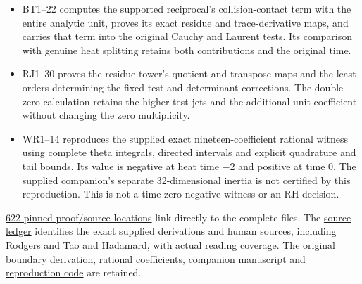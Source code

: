 \documentclass[
]{article}
\providecommand{\tightlist}{%
  \setlength{\itemsep}{0pt}\setlength{\parskip}{0pt}}
\begin{document}
\begin{itemize}
\tightlist
\item
  BT1--22 computes the supported reciprocal's collision-contact term
  with the entire analytic unit, proves its exact residue and
  trace-derivative maps, and carries that term into the original Cauchy
  and Laurent tests. Its comparison with genuine heat splitting retains
  both contributions and the original time.
\item
  RJ1--30 proves the residue tower's quotient and transpose maps and the
  least orders determining the fixed-test and determinant corrections.
  The double-zero calculation retains the higher test jets and the
  additional unit coefficient without changing the zero multiplicity.
\item
  WR1--14 reproduces the supplied exact nineteen-coefficient rational
  witness using complete theta integrals, directed intervals and
  explicit quadrature and tail bounds. Its value is negative at heat
  time −2 and positive at time 0. The supplied companion's separate
  32-dimensional inertia is not certified by this reproduction. This is
  not a time-zero negative witness or an RH decision.
\end{itemize}

\href{PINNED_PROOF_LINKS.json}{622 pinned proof/source locations} link
directly to the complete files. The
\href{https://github.com/KokunoYumeto/zeta-function-research-reader/blob/87e386271c488ce5914b9926c4d23d0857e0c367/workbenches/splitzero-tandem/continuations/20260923-boundary-residue-arithmetic/SOURCE_AND_RESULT_INDEX.json}{source
ledger} identifies the exact supplied derivations and human sources,
including \href{https://arxiv.org/abs/1801.05914v5}{Rodgers and Tao} and
\href{https://www.numdam.org/item/JMPA_1893_4_9__171_0/}{Hadamard}, with
actual reading coverage. The original
\href{https://github.com/KokunoYumeto/zeta-function-research-reader/blob/87e386271c488ce5914b9926c4d23d0857e0c367/workbenches/splitzero-tandem/continuations/20260923-boundary-residue-arithmetic/BOUNDARY_DEFECTS_AND_ARITHMETIC_RETURN.tex}{boundary
derivation},
\href{https://github.com/KokunoYumeto/zeta-function-research-reader/blob/87e386271c488ce5914b9926c4d23d0857e0c367/workbenches/splitzero-tandem/continuations/20260923-boundary-residue-arithmetic/rational_witness.json}{rational
coefficients},
\href{https://github.com/KokunoYumeto/zeta-function-research-reader/blob/87e386271c488ce5914b9926c4d23d0857e0c367/workbenches/splitzero-tandem/continuations/20260923-boundary-residue-arithmetic/non_eulerian_modular_heat_attempt.md}{companion
manuscript} and
\href{https://github.com/KokunoYumeto/zeta-function-research-reader/blob/87e386271c488ce5914b9926c4d23d0857e0c367/workbenches/splitzero-tandem/continuations/20260923-boundary-residue-arithmetic/reproduce_rational_witness.py}{reproduction
code} are retained.
\end{document}
